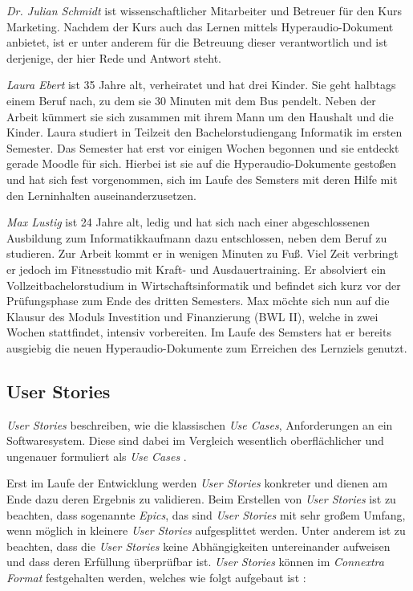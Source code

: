 {\Large\emph{Dr. Julian Schmidt}} ist wissenschaftlicher Mitarbeiter und Betreuer für den Kurs \glqq Marketing\grqq{}. Nachdem der Kurs auch das Lernen mittels Hyperaudio-Dokument anbietet, ist er unter anderem für die Betreuung dieser verantwortlich und ist derjenige, der hier Rede und Antwort steht.
\vspace{.5cm}

{\Large\emph{Laura Ebert}} ist 35 Jahre alt, verheiratet und hat drei Kinder. Sie geht halbtags einem Beruf nach, zu dem sie 30 Minuten mit dem Bus pendelt. Neben der Arbeit kümmert sie sich zusammen mit ihrem Mann um den Haushalt und die Kinder. Laura studiert in Teilzeit den Bachelorstudiengang Informatik im ersten Semester. Das Semester hat erst vor einigen Wochen begonnen und sie entdeckt gerade Moodle für sich. Hierbei ist sie auf die Hyperaudio-Dokumente gestoßen und hat sich fest vorgenommen, sich im Laufe des Semsters mit deren Hilfe mit den Lerninhalten auseinanderzusetzen.
\vspace{.5cm}
 
{\Large\emph{Max Lustig}} ist 24 Jahre alt, ledig und hat sich nach einer abgeschlossenen Ausbildung zum Informatikkaufmann dazu entschlossen, neben dem Beruf zu studieren. Zur Arbeit kommt er in wenigen Minuten zu Fuß. Viel Zeit verbringt er jedoch im Fitnesstudio mit Kraft- und Ausdauertraining. Er absolviert ein Vollzeitbachelorstudium in Wirtschaftsinformatik und befindet sich kurz vor der Prüfungsphase zum Ende des dritten Semesters. Max möchte sich nun auf die Klausur des Moduls \glqq Investition und Finanzierung (BWL II)\grqq{}, welche in zwei Wochen stattfindet, intensiv vorbereiten. Im Laufe des Semsters hat er bereits ausgiebig die neuen Hyperaudio-Dokumente zum Erreichen des Lernziels genutzt.

\par
\endgroup

\subsection{User Stories}
\label{sec:UserStories}
\textit{User Stories} beschreiben, wie die klassischen \textit{Use Cases}, Anforderungen an ein Softwaresystem. Diese sind dabei im Vergleich wesentlich oberflächlicher und ungenauer formuliert als \textit{Use Cases} \citep{wirdemann2017scrum}.

Erst im Laufe der Entwicklung werden \textit{User Stories} konkreter und dienen am Ende dazu deren Ergebnis zu validieren. Beim Erstellen von \textit{User Stories} ist zu beachten, dass sogenannte \textit{Epics}, das sind \textit{User Stories} mit sehr großem Umfang, wenn möglich in kleinere \textit{User Stories} aufgesplittet werden. Unter anderem ist zu beachten, dass die \textit{User Stories} keine Abhängigkeiten untereinander aufweisen und dass deren Erfüllung überprüfbar ist. \textit{User Stories} können im \textit{Connextra Format} festgehalten werden, welches wie folgt aufgebaut ist \citep{cohn2004user}:

